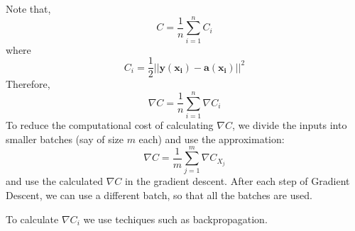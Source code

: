 \documentclass[12 pt]{report}
\begin{document}
    Note that,
    \begin{equation}
        C = \frac{1}{n}\sum_{i = 1}^{n} C_{i}
    \end{equation}
    where
    \begin{equation}
        C_{i} = \frac{1}{2} ||\bm{y}(\bm{x_{i}}) - \bm{a}(\bm{x_{i}})||^{2}
    \end{equation}
    Therefore,
    \begin{equation}
        \nabla C = \frac{1}{n} \sum_{i = 1}^{n} \nabla C_{i}
    \end{equation}
    To reduce the computational cost of calculating $\nabla C$, we divide the inputs into smaller batches (say of size $m$ each) and use the approximation:
    \begin{equation}
        \nabla C = \frac{1}{m} \sum_{j = 1}^{m} \nabla C_{X_{j}}
    \end{equation}
    and use the calculated $\nabla C$ in the gradient descent. After each step of Gradient Descent, we can use a different batch, so that all the batches are used.

    To calculate $\nabla C_{i}$ we use techiques such as backpropagation.
\end{document}
